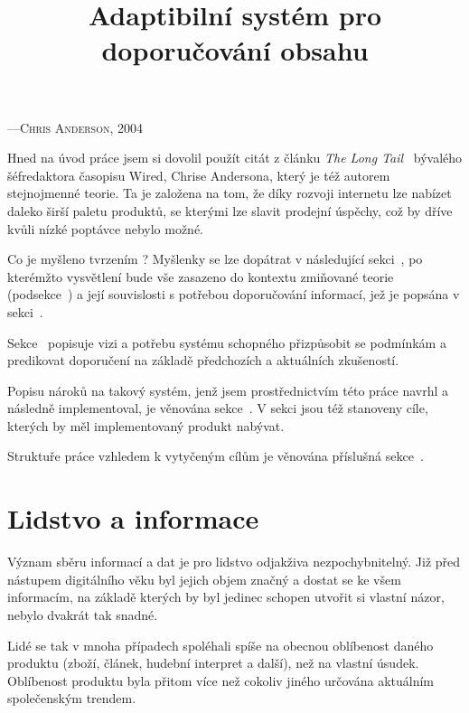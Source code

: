 \documentclass[thesis=M,czech]{FITthesis}[2014/05/07]
\title{Adaptibilní systém pro doporučování obsahu}
\begin{document}

\begin{introduction}
\begin{epigraphs}
%
 {---\textsc{Chris Anderson, 2004}}
 \end{epigraphs}	
	Hned na úvod práce jsem si dovolil použít citát z článku \emph{The Long Tail}~\cite{anderson} bývalého šéfredaktora časopisu Wired, Chrise Andersona, který je též autorem stejnojmenné teorie. Ta je založena na tom, že díky rozvoji internetu lze nabízet daleko širší paletu produktů, se kterými lze slavit prodejní úspěchy, což by dříve kvůli nízké poptávce nebylo možné. 
	
	Co je myšleno tvrzením ? Myšlenky se lze dopátrat v následující sekci~, po kterémžto vysvětlení bude vše zasazeno do kontextu zmiňované teorie (podsekce~) a její souvislosti s potřebou doporučování informací, jež je popsána v sekci~.
	
	Sekce~ popisuje vizi a potřebu systému schopného přizpůsobit se podmínkám a predikovat doporučení na základě předchozích a aktuálních zkušeností.
	
	Popisu nároků na takový systém, jenž jsem prostřednictvím této práce navrhl a následně implementoval, je věnována sekce~. V sekci jsou též stanoveny cíle, kterých by měl implementovaný produkt nabývat. 
	
	Struktuře práce vzhledem k vytyčeným cílům je věnována příslušná sekce~.
	
\section{Lidstvo a informace}	
	\label{sub:lidinf}
	Význam sběru informací a dat je pro lidstvo odjakživa nezpochybnitelný. Již před nástupem digitálního věku byl jejich objem značný a dostat se ke všem informacím, na základě kterých by byl jedinec schopen utvořit si vlastní názor, nebylo dvakrát tak snadné.
	
	Lidé se tak v mnoha případech spoléhali spíše na obecnou oblíbenost daného produktu (zboží, článek, hudební interpret a další), než na vlastní úsudek. Oblíbenost produktu byla přitom více než cokoliv jiného určována aktuálním společenským trendem.
	

\end{introduction}
\end{document}
